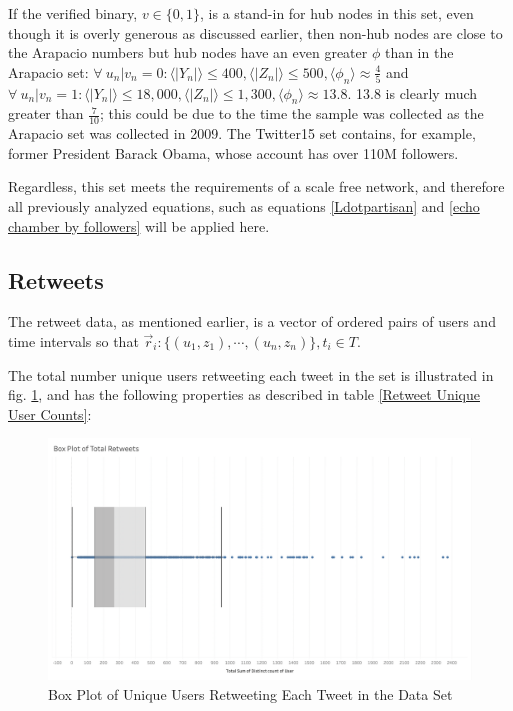 \documentclass[NETN,manuscript]{stjour-new}
\begin{document}
If the verified binary, $v \in \{0,1\}$, is a stand-in for hub nodes in this set, even though it is overly generous as discussed earlier, then non-hub nodes are close to the Arapacio numbers but hub nodes have an even greater $\phi$ than in the Arapacio set: $\forall \ u_n| v_n = 0:\langle |Y_n| \rangle \leq 400, \langle |Z_n| \rangle \leq 500, \langle  \phi_n \rangle \approx \frac{4}{5}$ and $\forall \ u_n| v_n = 1:\langle |Y_n| \rangle \leq 18,000, \langle |Z_n| \rangle \leq 1,300, \langle  \phi_n \rangle \approx 13.8$. 13.8 is clearly much greater than $\frac{7}{10}$; this could be due to the time the sample was collected as the Arapacio set was collected in 2009. The Twitter15 set contains, for example, former President Barack Obama, whose account has over 110M followers. 

Regardless, this set meets the requirements of a scale free network, and therefore all previously analyzed equations, such as equations \ref{Ldotpartisan} and \ref{echo chamber by followers} will be applied here.

\subsection{Retweets}
The retweet data, as mentioned earlier, is a vector of ordered pairs of users and time intervals so that $\vec{r}_i:\{(u_1,z_1), \cdots, (u_n,z_n)\}, t_i \in T$.

The total number unique users retweeting each tweet in the set is illustrated in fig. \ref{fig:Unique Retweeters}, and has the following properties as described in table \ref{Retweet Unique User Counts}:
\begin{figure}[h]
 \centering
  \includegraphics[width=12cm]{Retweet Box Plot.png}
  \caption{Box Plot of Unique Users Retweeting Each Tweet in the Data Set}\label{fig:Unique Retweeters}
 \end{figure}
 
\end{document}
